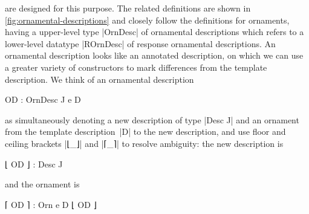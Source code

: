  are designed for this purpose.
The related definitions are shown in \autoref{fig:ornamental-descriptions} and closely follow the definitions for ornaments, having a upper-level type |OrnDesc| of ornamental descriptions which refers to a lower-level datatype |ROrnDesc| of response ornamental descriptions.
An ornamental description looks like an annotated description, on which we can use a greater variety of constructors to mark differences from the template description.
We think of an ornamental description
\begin{code}
OD : OrnDesc J e D
\end{code}
as simultaneously denoting a new description of type |Desc J| and an ornament from the template description~|D| to the new description, and use floor and ceiling brackets |⌊_⌋| and |⌈_⌉| to resolve ambiguity: the new description is
\begin{code}
⌊ OD ⌋ : Desc J
\end{code}
and the ornament is
\begin{code}
⌈ OD ⌉ : Orn e D ⌊ OD ⌋
\end{code}


